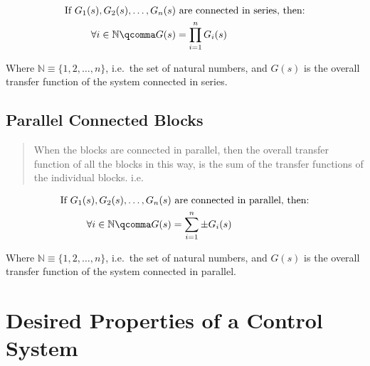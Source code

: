 \documentclass[
  14pt,
  a4paper,
  oneside,
  open=any,
  a4paper,
  14pt]{report}
\begin{document}
\[
\begin{aligned}
    \text{If } G_1(s), G_2(s), \ldots, G_n(s) & \text{ are connected in series, then:} \\
    \forall i \in \mathbb{N}\qcomma G(s) &= \prod\limits_{i=1}^{n} G_i(s)
\end{aligned}
\]

Where \(\mathbb{N} \equiv \{1, 2, \ldots, n\}\), i.e.~the set of natural
numbers, and \(G(s)\) is the overall transfer function of the system
connected in series.

\subsection{Parallel Connected Blocks}\label{parallel-connected-blocks}

\begin{quote}
When the blocks are connected in parallel, then the overall transfer
function of all the blocks in this way, is the sum of the transfer
functions of the individual blocks. i.e.
\end{quote}

\[
\begin{aligned}
    \text{If } G_1(s), G_2(s), \ldots, G_n(s) & \text{ are connected in parallel, then:} \\
    \forall i \in \mathbb{N}\qcomma G(s) &= \sum\limits_{i=1}^{n} \pm G_i(s)
\end{aligned}
\]

Where \(\mathbb{N} \equiv \{1, 2, \ldots, n\}\), i.e.~the set of natural
numbers, and \(G(s)\) is the overall transfer function of the system
connected in parallel.

\section{Desired Properties of a Control
System}\label{desired-properties-of-a-control-system}
\end{document}
